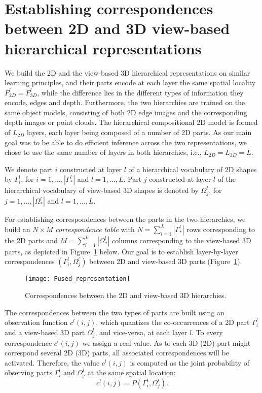 \documentclass[conference]{IEEEtran}
\begin{document}
\section{Establishing correspondences between 2D and 3D view-based hierarchical representations}
\label{sec:analysis}

We build the 2D and the view-based 3D hierarchical representations on similar learning principles, and their parts encode at each layer the same spatial locality $F_{2D}^l=F_{3D}^l$, while the difference lies in the different types of information they encode, edges and depth.
Furthermore, the two hierarchies are trained on the same object models, consisting of both 2D edge images and the corresponding depth images or point clouds.  
The hierarchical compositional 2D model is formed of $L_{2D}$ layers, each layer being composed of a number of 2D parts. 
As our main goal was to be able to do efficient inference across the two representations, we chose to use the same number of layers in both hierarchies, i.e., $L_{2D}=L_{3D}=L$.

We denote part $i$ constructed at layer $l$ of a hierarchical vocabulary of 2D shapes by $\Gamma_{i}^{l}$, for $i=1,\ldots,|\Gamma_*^l|$ and $l=1,\ldots,L$. Part $j$ constructed at layer $l$ of the  hierarchical vocabulary of view-based 3D shapes is denoted by $\Omega_{j}^{l}$, for $j=1,\ldots,|\Omega_*^l|$ and $l=1,\ldots,L$.

For establishing correspondences between the parts in the two hierarchies, we build an $N\times M$ \emph{correspondence table} with $N=\sum_{l=1}^L |\Gamma_*^l|$ rows corresponding to the 2D parts and $M=\sum_{l=1}^L |\Omega_*^l|$ columns corresponding to the view-based 3D parts, as depicted in Figure~\ref{fig:fused-models} below.  Our goal is to establish layer-by-layer correspondences $(\Gamma_{i}^l,\Omega_{j}^l)$ between 2D and view-based 3D  parts (Figure~\ref{fig:fused-models}).

\begin{figure}
\begin{center}
\texttt{[image: Fused\_representation]}
\end{center}
\caption{Correspondences between the 2D and view-based 3D hierarchies.}
\label{fig:fused-models}
\end{figure}

The correspondences between the two types of parts are built using an observation function $c^l(i,j)$, which quantizes the co-occurrences of a 2D part $\Gamma_i^l$ and a view-based 3D part $\Omega_j^l$, and vice-versa, at each layer $l$. 
To every correspondence $c^l(i,j)$ we assign a real value. As to each 3D (2D) part might correspond several 2D (3D) parts, all associated correspondences will be activated. Therefore, the value $c^l(i,j)$ is computed as the joint probability of observing parts $\Gamma_i^l$ and $\Omega_j^l$ at the same spatial location:
\begin{equation}
  c^l(i,j) = P(\Gamma_i^l,\Omega_j^l).
  \label{eqn:cij.Pij}
 \end{equation} 
\end{document}
